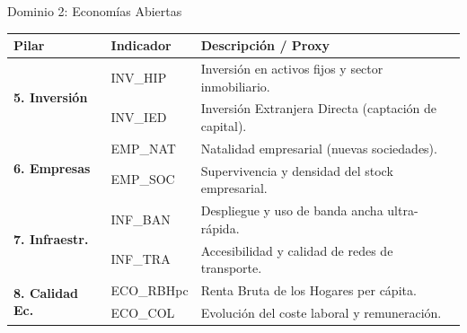 \documentclass[10pt, aspectratio=169]{beamer}
\begin{document}
\begin{frame}{Dominio 2: Economías Abiertas}
    \small
    \begin{table}[]
        \centering
        \begin{tabular}{llp{7cm}}
            \toprule
            \textbf{Pilar} & \textbf{Indicador} & \textbf{Descripción / Proxy} \\
            \midrule
            \multirow{2}{*}{\textbf{5. Inversión}}  & INV\_HIP & Inversión en activos fijos y sector inmobiliario. \\
                                                   & INV\_IED & Inversión Extranjera Directa (captación de capital). \\
            \midrule
            \multirow{2}{*}{\textbf{6. Empresas}}   & EMP\_NAT & Natalidad empresarial (nuevas sociedades). \\
                                                   & EMP\_SOC & Supervivencia y densidad del stock empresarial. \\
            \midrule
            \multirow{2}{*}{\textbf{7. Infraestr.}} & INF\_BAN & Despliegue y uso de banda ancha ultra-rápida. \\
                                                   & INF\_TRA & Accesibilidad y calidad de redes de transporte. \\
            \midrule
            \multirow{2}{*}{\textbf{8. Calidad Ec.}} & ECO\_RBHpc & Renta Bruta de los Hogares per cápita. \\
                                                   & ECO\_COL & Evolución del coste laboral y remuneración. \\
            \bottomrule
        \end{tabular}
    \end{table}
\end{frame}
\end{document}
